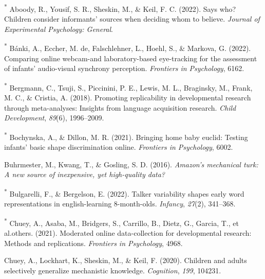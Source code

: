 \documentclass[
  man,floatsintext]{apa6}
\newlength{\cslhangindent}
\newlength{\cslentryspacingunit} %
\newenvironment{CSLReferences}[2] %
 {%
  \setlength{\parindent}{0pt}
  \ifodd #1
  \let\oldpar\par
  \def\par{\hangindent=\cslhangindent\oldpar}
  \fi
  \setlength{\parskip}{#2\cslentryspacingunit}
 }%
 {}
\begin{document}
\hypertarget{refs}{}
\begin{CSLReferences}{1}{0}
\leavevmode{}%
\textsuperscript{*} Aboody, R., Yousif, S. R., Sheskin, M., \& Keil, F. C. (2022). Says who? Children consider informants' sources when deciding whom to believe. \emph{Journal of Experimental Psychology: General}.

\leavevmode{}%
\textsuperscript{*} Bánki, A., Eccher, M. de, Falschlehner, L., Hoehl, S., \& Markova, G. (2022). Comparing online webcam-and laboratory-based eye-tracking for the assessment of infants' audio-visual synchrony perception. \emph{Frontiers in Psychology}, 6162.

\leavevmode{}%
\textsuperscript{*} Bergmann, C., Tsuji, S., Piccinini, P. E., Lewis, M. L., Braginsky, M., Frank, M. C., \& Cristia, A. (2018). Promoting replicability in developmental research through meta-analyses: Insights from language acquisition research. \emph{Child Development}, \emph{89}(6), 1996--2009.

\leavevmode{}%
\textsuperscript{*} Bochynska, A., \& Dillon, M. R. (2021). Bringing home baby euclid: Testing infants' basic shape discrimination online. \emph{Frontiers in Psychology}, 6002.

\leavevmode{}%
Buhrmester, M., Kwang, T., \& Gosling, S. D. (2016). \emph{Amazon's mechanical turk: A new source of inexpensive, yet high-quality data?}

\leavevmode{}%
\textsuperscript{*} Bulgarelli, F., \& Bergelson, E. (2022). Talker variability shapes early word representations in english-learning 8-month-olds. \emph{Infancy}, \emph{27}(2), 341--368.

\leavevmode{}%
\textsuperscript{*} Chuey, A., Asaba, M., Bridgers, S., Carrillo, B., Dietz, G., Garcia, T., et al.others. (2021). Moderated online data-collection for developmental research: Methods and replications. \emph{Frontiers in Psychology}, 4968.

\leavevmode{}%
Chuey, A., Lockhart, K., Sheskin, M., \& Keil, F. (2020). Children and adults selectively generalize mechanistic knowledge. \emph{Cognition}, \emph{199}, 104231.


\end{CSLReferences}
\end{document}
